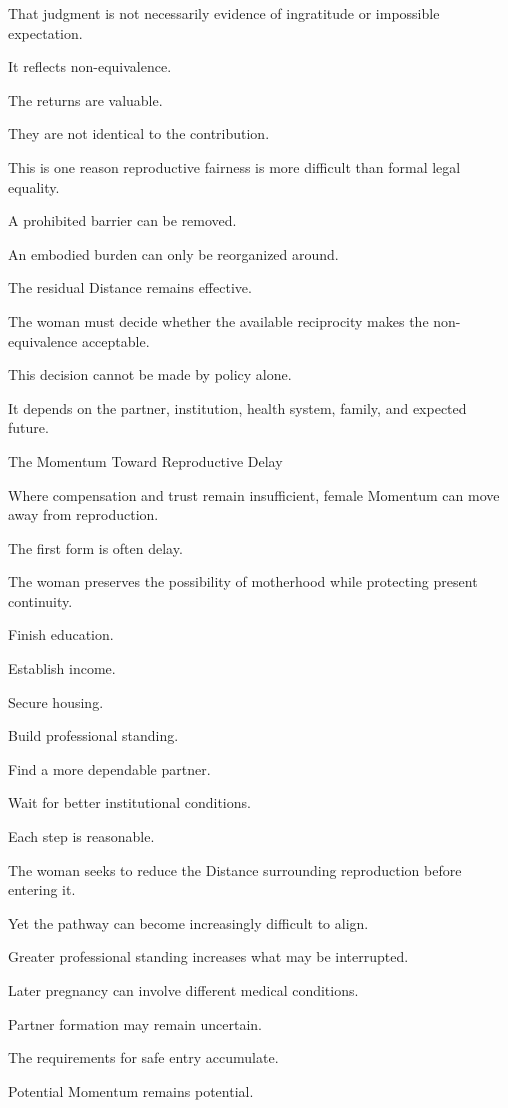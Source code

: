 That judgment is not necessarily evidence of ingratitude or impossible expectation.

It reflects non-equivalence.

The returns are valuable.

They are not identical to the contribution.

This is one reason reproductive fairness is more difficult than formal legal equality.

A prohibited barrier can be removed.

An embodied burden can only be reorganized around.

The residual Distance remains effective.

The woman must decide whether the available reciprocity makes the non-equivalence acceptable.

This decision cannot be made by policy alone.

It depends on the partner, institution, health system, family, and expected future.

The Momentum Toward Reproductive Delay

Where compensation and trust remain insufficient, female Momentum can move away from reproduction.

The first form is often delay.

The woman preserves the possibility of motherhood while protecting present continuity.

Finish education.

Establish income.

Secure housing.

Build professional standing.

Find a more dependable partner.

Wait for better institutional conditions.

Each step is reasonable.

The woman seeks to reduce the Distance surrounding reproduction before entering it.

Yet the pathway can become increasingly difficult to align.

Greater professional standing increases what may be interrupted.

Later pregnancy can involve different medical conditions.

Partner formation may remain uncertain.

The requirements for safe entry accumulate.

Potential Momentum remains potential.

